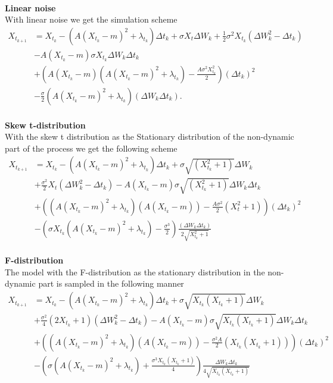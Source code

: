 \\
\textbf{Linear noise}\\
With linear noise we get the simulation scheme
\begin{align}
    X_{t_{k + 1}} &= X_{t_k} - \left(A(X_{t_k} - m)^2 + \lambda_{t_k}\right) \Delta t_k + \sigma X_t \Delta W_{k} + \frac{1}{2}\sigma^2 X_{t_k}\left(\Delta W_{k}^2 - \Delta t_k\right) \nonumber \\
    &-A(X_{t_k} - m)\sigma X_{t_k} \Delta W_k\Delta t_k \nonumber\\
    & + \left(A\left(X_{t_k} - m\right)\left(A\left(X_{t_k} - m\right)^2 + \lambda_{t_k}\right) - \frac{A\sigma^2X_{t_k}^2}{2}\right)(\Delta t_k)^2 \nonumber \\
    &- \frac{\sigma}{2}\left(A\left(X_{t_k} - m\right)^2 + \lambda_{t_k}\right)\left(\Delta W_{k}\Delta t_k\right).
\end{align}
\\
\textbf{Skew t-distribution}\\
With the skew t distribution as the Stationary distribution of the non-dynamic part of the process we get the following scheme
\begin{align}
    X_{t_{k + 1}} &= X_{t_k} - \left(A(X_{t_k} - m)^2 + \lambda_{t_k}\right) \Delta t_k + \sigma \sqrt{\left(X_{t_k}^2 + 1\right)} \Delta W_{k} \nonumber\\
    &+ \frac{\sigma^2}{2}X_t \left(\Delta W_{k}^2 - \Delta t_k\right) - A\left(X_{t_k} - m \right)\sigma\sqrt{\left(X_{t_k}^2 + 1\right)}\Delta W_{k}\Delta t_k \nonumber\\
    &+ \left(\left(A\left(X_{t_k} - m \right)^2+\lambda_{t_k}\right)\left(A\left(X_{t_k} - m \right)\right) - \frac{A\sigma^2}{2}\left(X_t^2 + 1\right)\right)\left(\Delta t_k\right)^2 \nonumber\\
    &-\left(\sigma X_{t_k}\left(A\left(X_{t_k} - m \right)^2 + \lambda_{t_k}\right) - \frac{\sigma^3}{2}\right)\frac{\left(\Delta W_{k}\Delta t_k\right)}{2\sqrt{X_{t_k}^2 + 1}}
\end{align}
\\
\textbf{F-distribution}\\
The model with the F-distribution as the stationary distribution in the non-dynamic part is sampled in the following manner
\begin{align}
    X_{t_{k + 1}} &= X_{t_k} - \left(A(X_{t_k} - m)^2 + \lambda_{t_k}\right) \Delta t_k + \sigma\sqrt{X_{t_k}\left(X_{t_k} + 1\right)}\Delta W_k \nonumber \\
    &+ \frac{\sigma^2}{4}\left(2X_{t_k} + 1\right)\left(\Delta W_k^2 - \Delta t_k\right) - A \left(X_{t_k} - m\right)\sigma \sqrt{X_{t_k}\left(X_{t_k} + 1\right)}\Delta W_k \Delta t_k \nonumber \\
    &+ \left(\left(A\left(X_{t_k} - m\right)^2 + \lambda_{t_k}\right)\left(A\left(X_{t_k} - m\right)\right) - \frac{\sigma^2A}{2}\left(X_{t_k}\left(X_{t_k} + 1\right)\right)  \right)\left(\Delta t_k\right)^2 \nonumber \\
    &- \left(\sigma\left(A\left(X_{t_k} - m\right)^2 + \lambda_{t_k}\right) + \frac{\sigma^3X_{t_k}\left(X_{t_k} + 1\right)}{4}\right)\frac{\Delta W_k \Delta t_k}{4\sqrt{X_{t_k}\left(X_{t_k} + 1\right)}}
\end{align}
